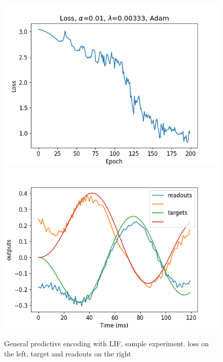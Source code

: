 \documentclass[mphil,deptreport,ianc]{infthesis} %
\begin{document}
\begin{figure}
    \centering
    \includegraphics[width=0.49\columnwidth]{figures/Gating/GeneralPredictiveEncoding/LIF_sample/plot_loss_test_mt_LIF_et_GeneralPredictiveEncoding_N_30_titers_200.png}
    \includegraphics[width=0.49\columnwidth]{figures/Gating/GeneralPredictiveEncoding/LIF_sample/test_plot_outputs_LIF_seed_24.png}
    \caption{General predictive encoding with LIF, sample experiment. loss on the left, target and readouts on the right}
    \label{fig:general_predictive_LIF}
\end{figure}
\end{document}
